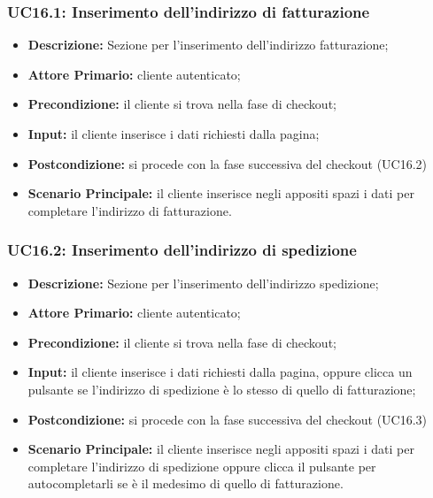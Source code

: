            \subsubsection{UC16.1: Inserimento dell'indirizzo di fatturazione}
                \begin{itemize}
                    \item \textbf{Descrizione:} Sezione per l'inserimento dell'indirizzo fatturazione;
                    \item \textbf{Attore Primario:} cliente autenticato;
                    \item \textbf{Precondizione:} il cliente si trova nella fase di checkout;
                    \item \textbf{Input:} il cliente inserisce i dati richiesti dalla pagina;
                    \item \textbf{Postcondizione:} si procede con la fase successiva del checkout (UC16.2)
                    \item \textbf{Scenario Principale:} il cliente inserisce negli appositi spazi i dati per completare l'indirizzo di fatturazione.
                \end{itemize}
            \subsubsection{UC16.2: Inserimento dell'indirizzo di spedizione}
                \begin{itemize}
                    \item \textbf{Descrizione:} Sezione per l'inserimento dell'indirizzo spedizione;
                    \item \textbf{Attore Primario:} cliente autenticato;
                    \item \textbf{Precondizione:} il cliente si trova nella fase di checkout;
                    \item \textbf{Input:} il cliente inserisce i dati richiesti dalla pagina, oppure clicca un pulsante se l'indirizzo di spedizione è lo stesso di quello di fatturazione;
                    \item \textbf{Postcondizione:} si procede con la fase successiva del checkout (UC16.3)
                    \item \textbf{Scenario Principale:} il cliente inserisce negli appositi spazi i dati per completare l'indirizzo di spedizione oppure clicca il pulsante per autocompletarli se è il medesimo di quello di fatturazione.
                \end{itemize}

